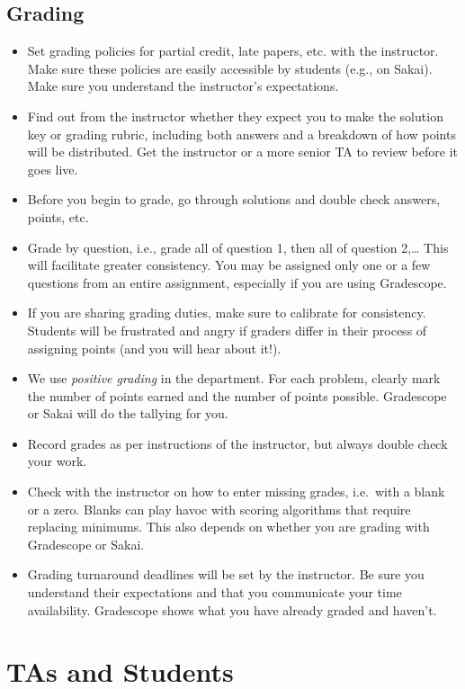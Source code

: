 \documentclass[
]{article}
\begin{document}
\hypertarget{grading}{%
\subsection{Grading}\label{grading}}

\begin{itemize}
\item
  Set grading policies for partial credit, late papers, etc. with the instructor. Make sure these policies are easily accessible by students (e.g., on Sakai). Make sure you understand the instructor's expectations.
\item
  Find out from the instructor whether they expect you to make the solution key or grading rubric, including both answers and a breakdown of how points will be distributed. Get the instructor or a more senior TA to review before it goes live.
\item
  Before you begin to grade, go through solutions and double check answers, points, etc.
\item
  Grade by question, i.e., grade all of question 1, then all of question 2,\ldots{} This will facilitate greater consistency. You may be assigned only one or a few questions from an entire assignment, especially if you are using Gradescope.
\item
  If you are sharing grading duties, make sure to calibrate for consistency. Students will be frustrated and angry if graders differ in their process of assigning points (and you will hear about it!).
\item
  We use \emph{positive grading} in the department. For each problem, clearly mark the number of points earned and the number of points possible. Gradescope or Sakai will do the tallying for you.
\item
  Record grades as per instructions of the instructor, but always double check your work.
\item
  Check with the instructor on how to enter missing grades, i.e.~with a blank or a zero. Blanks can play havoc with scoring algorithms that require replacing minimums. This also depends on whether you are grading with Gradescope or Sakai.
\item
  Grading turnaround deadlines will be set by the instructor. Be sure you understand their expectations and that you communicate your time availability. Gradescope shows what you have already graded and haven't.
\end{itemize}

\hypertarget{tas-and-students}{%
\section{TAs and Students}\label{tas-and-students}}
\end{document}

